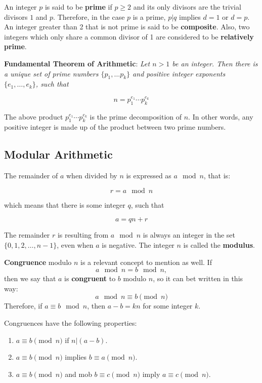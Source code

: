 An integer $p$ is said to be \textbf{prime} if $p\geq 2$ and its only divisors are the trivial divisors $1$ and $p$. Therefore, in the case $p$ is a prime, $p|q$ implies $d=1$ or $d=p$. An integer greater than 2 that is not prime is said to be \textbf{composite}. Also, two integers which only share a common divisor of 1 are considered to be \textbf{relatively prime}.

\textbf{Fundamental Theorem of Arithmetic}: \textit{Let $n > 1$ be an integer. Then there is a unique set of prime numbers $\{p_{1}, \dots p_{k}\}$ and positive integer exponents  $\{e_{1}, \dots , e_{k}\}$, such that}

\[
n = p_{1}^{e_{1}} \cdots p_{k}^{e_{k}}
\]

The above product $p_{1}^{e_{1}} \cdots p_{k}^{e_{k}}$ is the prime decomposition of $n$. In other words, any positive integer is made up of the product between two prime numbers.   

\subsection{Modular Arithmetic}

The remainder of $a$ when divided by $n$ is expressed as $a \mod n$, that is:

\[
  r = a \mod n
\]

\noindent which means that there is some integer $q$, such that

\[
  a = qn + r
\]

The remainder $r$ is resulting from $a \mod n$ is always an integer in the set $\{0, 1, 2, \dots, n-1\}$, even when $a$ is negative. The integer $n$ is called the \textbf{modulus}. 

\textbf{Congruence} modulo $n$ is a relevant concept to mention as well. If
\[
  a \mod n = b \mod n,
\]
\noindent then we say that $a$ is \textbf{congruent} to $b$ modulo $n$, so it can bet written in this way:
\[
a \mod n \equiv b \pmod n
\]
Therefore, if $a \equiv b \mod n$, then $a-b=kn$ for some integer $k$. 

Congruences have the following properties: 
\begin{enumerate}
\item $a \equiv b \pmod n$ if $n|(a-b)$.
\item $a \equiv b \pmod n$ implies $b \equiv a \pmod n$.
\item $a \equiv b \pmod n$ and mob $b \equiv c \pmod n$  imply $a \equiv c \pmod n$.
\end{enumerate}

